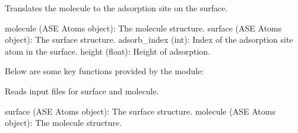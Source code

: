 \documentclass[letterpaper,10pt,english]{sphinxmanual}
\begin{document}

\begin{fulllineitems}
\label{\detokenize{module_documentation:Adsorption.translate_molecule}}
\pysigstartsignatures
{}
\pysigstopsignatures
\sphinxAtStartPar
Translates the molecule to the adsorption site on the surface.
\begin{description}
\sphinxAtStartPar
molecule (ASE Atoms object): The molecule structure.
surface (ASE Atoms object): The surface structure.
adsorb\_index (int): Index of the adsorption site atom in the surface.
height (float): Height of adsorption.

\end{description}

\end{fulllineitems}


\sphinxAtStartPar
Below are some key functions provided by the  module:

\begin{fulllineitems}
\label{\detokenize{module_documentation:id0}}
\pysigstartsignatures
{}
\pysigstopsignatures
\sphinxAtStartPar
Reads input files for surface and molecule.
\begin{description}
\sphinxAtStartPar
surface (ASE Atoms object): The surface structure.
molecule (ASE Atoms object): The molecule structure.

\end{description}

\end{fulllineitems}

\end{document}
